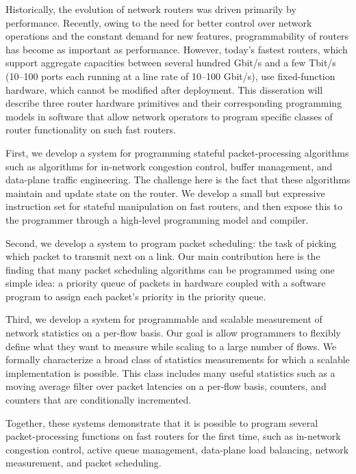 % 
% 
%
Historically, the evolution of network routers was driven primarily by
performance. Recently, owing to the need for better control over network
operations and the constant demand for new features, programmability of routers
has become as important as performance.  However, today's fastest routers,
which support aggregate capacities between several hundred Gbit/s and a few
Tbit/s (10--100 ports each running at a line rate of 10--100 Gbit/s), use
fixed-function hardware, which cannot be modified after deployment. This
disseration will describe three router hardware primitives and their
corresponding programming models in software that allow network operators to
program specific classes of router functionality on such fast routers.

First, we develop a system for programming stateful packet-processing
algorithms such as algorithms for in-network congestion control, buffer
management, and data-plane traffic engineering. The challenge here is the fact
that these algorithms maintain and update state on the router.  We develop a
small but expressive instruction set for stateful manipulation on fast routers,
and then expose this to the programmer through a high-level programming model
and compiler.

Second, we develop a system to program packet scheduling: the task of picking
which packet to transmit next on a link. Our main contribution here is the
finding that many packet scheduling algorithms can be programmed using one
simple idea: a priority queue of packets in hardware coupled with a software
program to assign each packet's priority in the priority queue.

Third, we develop a system for programmable and scalable measurement of network
statistics on a per-flow basis. Our goal is allow programmers to flexibly
define what they want to measure while scaling to a large number of flows. We
formally characterize a broad class of statistics measurements for which a
scalable implementation is possible. This class includes many useful statistics
such as a moving average filter over packet latencies on a per-flow basis,
counters, and counters that are conditionally incremented.

Together, these systems demonstrate that it is possible to program several
packet-processing functions on fast routers for the first time, such as
in-network congestion control, active queue management, data-plane load
balancing, network measurement, and packet scheduling.
